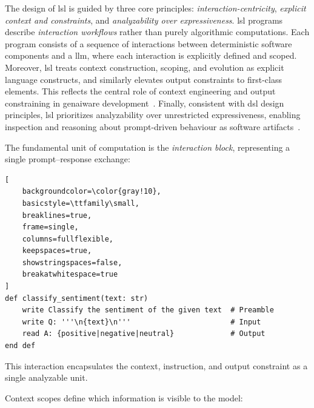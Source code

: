 \documentclass[manuscript,screen]{acmart}
\begin{document}
The design of \ac{lsl} is guided by three core principles:
\emph{interaction-centricity},
\emph{explicit context and constraints}, and
\emph{analyzability over expressiveness}.
\ac{lsl} programs describe \emph{interaction workflows} rather than purely algorithmic computations. 
Each program consists of a sequence of interactions between deterministic software components and a \ac{llm}, where each interaction is explicitly defined and scoped.
Moreover, \ac{lsl} treats context construction, scoping, and evolution as explicit language constructs, and similarly elevates output constraints to first-class elements. This reflects the central role of context engineering and output constraining in \ac{genai}ware development~\cite{llm_se_roadmap}.
Finally, consistent with \ac{dsl} design principles, \acl{lsl} prioritizes analyzability over unrestricted expressiveness, enabling inspection and reasoning about prompt-driven behaviour as software artifacts~\cite{DBLP:conf/sofsem/Mernik17}.



The fundamental unit of computation is the \emph{interaction block}, representing a single prompt--response exchange:

\begin{lstlisting}[
    backgroundcolor=\color{gray!10},
    basicstyle=\ttfamily\small,
    breaklines=true,
    frame=single,
    columns=fullflexible,
    keepspaces=true,
    showstringspaces=false,
    breakatwhitespace=true
]
def classify_sentiment(text: str)
    write Classify the sentiment of the given text  # Preamble
    write Q: '''\n{text}\n'''                       # Input
    read A: {positive|negative|neutral}             # Output
end def
\end{lstlisting}

This interaction encapsulates the context, instruction, and output constraint as a single analyzable unit.

Context scopes define which information is visible to the model:
\end{document}
